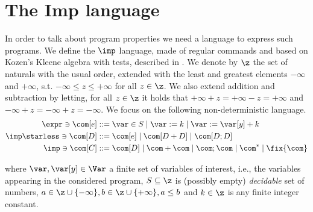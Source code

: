 \section{The Imp language}

In order to talk about program properties we need a language to
express such programs. We define the \(\imp\) language, made of
regular commands and based on Kozen’s Kleene algebra with tests,
described in \cite{kozen1997kleene}.  We denote by \(\z\) the set of
naturals with the usual order, extended with the least and greatest
elements \(-\infty\) and \(+\infty\), s.t.
\(-\infty \leq z \leq +\infty\) for all \(z \in \z\). We also extend
addition and subtraction by letting, for all \(z \in \z\) it holds
that \(+\infty + z = + \infty - z = + \infty\) and
\(-\infty + z = -\infty + z = -\infty\).  We focus on the following
non-deterministic language.
\begin{align*}
  \expr \ni \com[e] ::= & \; \var \in S %
                          \mid \var := k \mid \var := \var[y] + k %
  \\
  \imp\starless \ni \com[D] ::= & \; \com[e] \mid \com[D + D] \mid \com[D ; D] \\
  \imp \ni \com[C] ::= & \; \com[D] \mid \com + \com \mid \com ; \com \mid \com^* \mid \fix{\com}
\end{align*}

where \(\var, \var[y] \in \Var\) a finite set of variables of
interest, i.e., the variables appearing in the considered program,
\(S\subseteq \z\) is (possibly empty) \emph{decidable} set of numbers,
\({a \in \z \cup \{-\infty\}}, {b \in \z \cup\{+\infty\}}, {a\leq b}\)
and \({k \in \z}\) is any finite integer constant.
